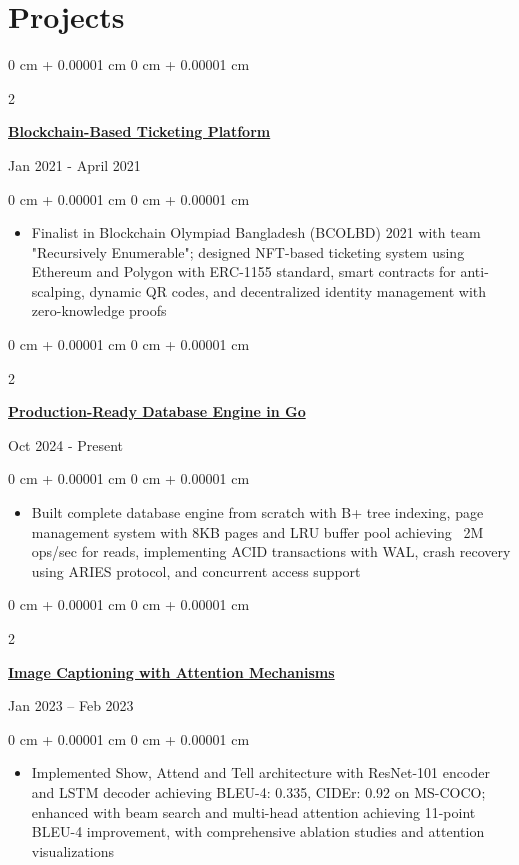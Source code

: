 \documentclass[10pt, letterpaper]{article}
\newenvironment{highlights}{
    \begin{itemize}[
        topsep=0.10 cm,
        parsep=0.10 cm,
        partopsep=0pt,
        itemsep=0pt,
        leftmargin=0 cm + 10pt
    ]
}{
    \end{itemize}
} %
\newenvironment{onecolentry}{
    \begin{adjustwidth}{
        0 cm + 0.00001 cm
    }{
        0 cm + 0.00001 cm
    }
}{
    \end{adjustwidth}
} %
\newenvironment{twocolentry}[2][]{
    \onecolentry
    \def\secondColumn{#2}
    \setcolumnwidth{\fill, 4.5 cm}
    \begin{paracol}{2}
}{
    \switchcolumn \raggedleft \secondColumn
    \end{paracol}
    \endonecolentry
} %
\begin{document}
        \vspace{0.2 cm}


\section{Projects}
               \begin{twocolentry}{
            {Jan 2021 - April 2021}
        }
            \href{https://tanzimhromel.com/showcase/projects/blockchain-ticketing/}{\textbf{Blockchain-Based Ticketing Platform}}
        \end{twocolentry}
        \begin{onecolentry}
            \begin{highlights}
                \item Finalist in Blockchain Olympiad Bangladesh (BCOLBD) 2021 with team "Recursively Enumerable"; designed NFT-based ticketing system using Ethereum and Polygon with ERC-1155 standard, smart contracts for anti-scalping, dynamic QR codes, and decentralized identity management with zero-knowledge proofs
                \end{highlights}
                
        \end{onecolentry}

        \begin{twocolentry}{
            {Oct 2024 - Present}
        }
            \href{https://github.com/thromel/go-database}{\textbf{Production-Ready Database Engine in Go}}
        \end{twocolentry}
        \begin{onecolentry}
            \begin{highlights}
                \item Built complete database engine from scratch with B+ tree indexing, page management system with 8KB pages and LRU buffer pool achieving ~2M ops/sec for reads, implementing ACID transactions with WAL, crash recovery using ARIES protocol, and concurrent access support
            \end{highlights}
        \end{onecolentry}

        \begin{twocolentry}{
    {Jan 2023 – Feb 2023}
}
    \href{https://github.com/thromel/Image-Captioning-ML-Project}{\textbf{Image Captioning with Attention Mechanisms}}
\end{twocolentry}

\begin{onecolentry}
    \begin{highlights}
        \item Implemented Show, Attend and Tell architecture with ResNet-101 encoder and LSTM decoder achieving BLEU-4: 0.335, CIDEr: 0.92 on MS-COCO; enhanced with beam search and multi-head attention achieving 11-point BLEU-4 improvement, with comprehensive ablation studies and attention visualizations
    \end{highlights}
\end{onecolentry}
        
\end{document}
